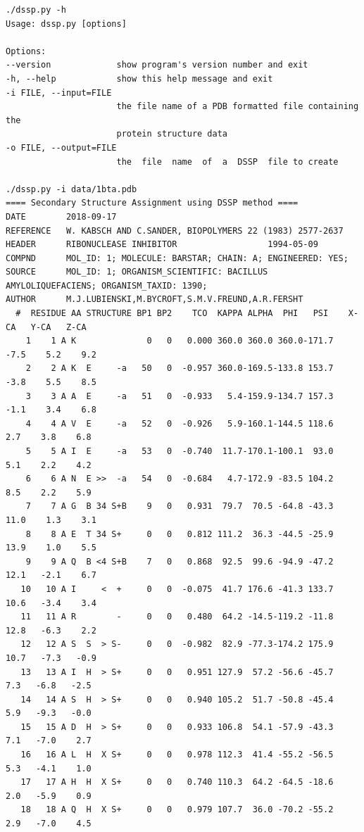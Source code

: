 \documentclass[12pt]{article}
\begin{document}
\begin{lstlisting}
./dssp.py -h
Usage: dssp.py [options]

Options:
--version             show program's version number and exit
-h, --help            show this help message and exit
-i FILE, --input=FILE
                      the file name of a PDB formatted file containing the
                      protein structure data
-o FILE, --output=FILE
                      the  file  name  of  a  DSSP  file to create

./dssp.py -i data/1bta.pdb
==== Secondary Structure Assignment using DSSP method ====
DATE		2018-09-17
REFERENCE	W. KABSCH AND C.SANDER, BIOPOLYMERS 22 (1983) 2577-2637
HEADER		RIBONUCLEASE INHIBITOR                  1994-05-09
COMPND		MOL_ID: 1; MOLECULE: BARSTAR; CHAIN: A; ENGINEERED: YES; 
SOURCE		MOL_ID: 1; ORGANISM_SCIENTIFIC: BACILLUS AMYLOLIQUEFACIENS; ORGANISM_TAXID: 1390; 
AUTHOR		M.J.LUBIENSKI,M.BYCROFT,S.M.V.FREUND,A.R.FERSHT
  #  RESIDUE AA STRUCTURE BP1 BP2    TCO  KAPPA ALPHA  PHI   PSI    X-CA   Y-CA   Z-CA
    1    1 A K              0   0   0.000 360.0 360.0 360.0-171.7   -7.5    5.2    9.2
    2    2 A K  E     -a   50   0  -0.957 360.0-169.5-133.8 153.7   -3.8    5.5    8.5
    3    3 A A  E     -a   51   0  -0.933   5.4-159.9-134.7 157.3   -1.1    3.4    6.8
    4    4 A V  E     -a   52   0  -0.926   5.9-160.1-144.5 118.6    2.7    3.8    6.8
    5    5 A I  E     -a   53   0  -0.740  11.7-170.1-100.1  93.0    5.1    2.2    4.2
    6    6 A N  E >>  -a   54   0  -0.684   4.7-172.9 -83.5 104.2    8.5    2.2    5.9
    7    7 A G  B 34 S+B    9   0   0.931  79.7  70.5 -64.8 -43.3   11.0    1.3    3.1
    8    8 A E  T 34 S+     0   0   0.812 111.2  36.3 -44.5 -25.9   13.9    1.0    5.5
    9    9 A Q  B <4 S+B    7   0   0.868  92.5  99.6 -94.9 -47.2   12.1   -2.1    6.7
   10   10 A I     <  +     0   0  -0.075  41.7 176.6 -41.3 133.7   10.6   -3.4    3.4
   11   11 A R        -     0   0   0.480  64.2 -14.5-119.2 -11.8   12.8   -6.3    2.2
   12   12 A S  S  > S-     0   0  -0.982  82.9 -77.3-174.2 175.9   10.7   -7.3   -0.9
   13   13 A I  H  > S+     0   0   0.951 127.9  57.2 -56.6 -45.7    7.3   -6.8   -2.5
   14   14 A S  H  > S+     0   0   0.940 105.2  51.7 -50.8 -45.4    5.9   -9.3   -0.0
   15   15 A D  H  > S+     0   0   0.933 106.8  54.1 -57.9 -43.3    7.1   -7.0    2.7
   16   16 A L  H  X S+     0   0   0.978 112.3  41.4 -55.2 -56.5    5.3   -4.1    1.0
   17   17 A H  H  X S+     0   0   0.740 110.3  64.2 -64.5 -18.6    2.0   -5.9    0.9
   18   18 A Q  H  X S+     0   0   0.979 107.7  36.0 -70.2 -55.2    2.9   -7.0    4.5

\end{lstlisting}
\end{document}
